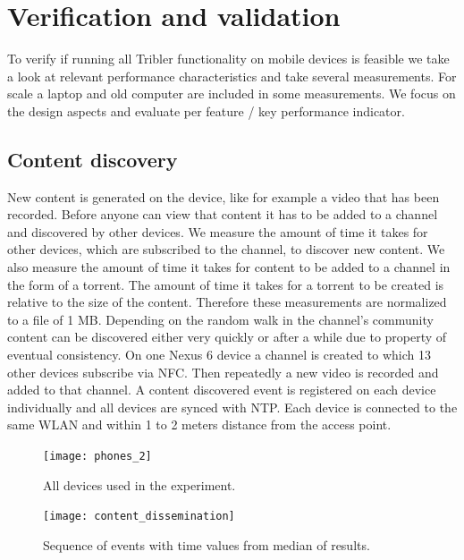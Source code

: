 \chapter{Verification and validation}
To verify if running all Tribler functionality on mobile devices is feasible we take a look at relevant performance characteristics and take several measurements.
For scale a laptop and old computer are included in some measurements.
We focus on the design aspects and evaluate per feature / key performance indicator.


\section{Content discovery}
New content is generated on the device, like for example a video that has been recorded.
Before anyone can view that content it has to be added to a channel and discovered by other devices.
We measure the amount of time it takes for other devices, which are subscribed to the channel, to discover new content.
We also measure the amount of time it takes for content to be added to a channel in the form of a torrent.
The amount of time it takes for a torrent to be created is relative to the size of the content.
Therefore these measurements are normalized to a file of 1 MB.
Depending on the random walk in the channel's community content can be discovered either very quickly or after a while due to property of eventual consistency.
On one Nexus 6 device a channel is created to which 13 other devices subscribe via NFC.
Then repeatedly a new video is recorded and added to that channel.
A content discovered event is registered on each device individually and all devices are synced with NTP.
Each device is connected to the same WLAN and within 1 to 2 meters distance from the access point.
\begin{figure}[h]
	\centering
	\texttt{[image: phones\_2]}
	\caption{All devices used in the experiment.}
	\label{fig:phones_2}
\end{figure}
\begin{figure}[h]
	\centering
	\texttt{[image: content\_dissemination]}
	\caption{Sequence of events with time values from median of results.}
	\label{fig:content_dissemination}
\end{figure}
